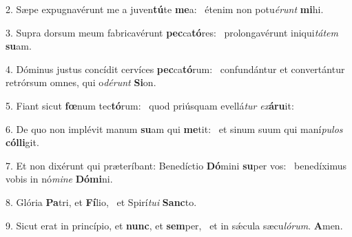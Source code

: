 2. Sæpe expugnavérunt me a juven\textbf{tú}te \textbf{me}a: \ast\  étenim non potu\textit{é}\textit{runt} \textbf{mi}hi.\

3. Supra dorsum meum fabricavérunt \textbf{pec}ca\textbf{tó}res: \ast\  prolongavérunt iniqui\textit{tá}\textit{tem} \textbf{su}am.\

4. Dóminus justus concídit cervíces \textbf{pec}ca\textbf{tó}rum: \ast\  confundántur et convertántur retrórsum omnes, qui o\textit{dé}\textit{runt} \textbf{Si}on.\

5. Fiant sicut \textbf{fœ}num tec\textbf{tó}rum: \ast\  quod priúsquam evellá\textit{tur} \textit{ex}\textbf{á}\textbf{ru}it:\

6. De quo non implévit manum \textbf{su}am qui \textbf{me}tit: \ast\  et sinum suum qui maní\textit{pu}\textit{los} \textbf{cól}\textbf{li}git.\

7. Et non dixérunt qui præteríbant: Benedíctio \textbf{Dó}mini \textbf{su}per vos: \ast\  benedíximus vobis in nó\textit{mi}\textit{ne} \textbf{Dó}\textbf{mi}ni.\

8. Glória \textbf{Pa}tri, et \textbf{Fí}lio, \ast\  et Spirí\textit{tu}\textit{i} \textbf{Sanc}to.\

9. Sicut erat in princípio, et \textbf{nunc}, et \textbf{sem}per, \ast\  et in sǽcula sæcu\textit{ló}\textit{rum}. \textbf{A}men.\

